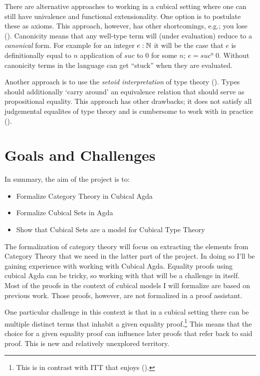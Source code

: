 \documentclass{article}
\begin{document}
There are alternative approaches to working in a cubical setting where one can
still have univalence and functional extensionality. One option is to postulate
these as axioms. This approach, however, has other shortcomings, e.g.; you lose
 (\cite{huber-2016}). Canonicity means that any well-type
term will (under evaluation) reduce to a \emph{canonical} form. For example for
an integer $e : \mathbb{N}$ it will be the case that $e$ is definitionally equal to $n$
application of $\mathit{suc}$ to $0$ for some $n$; $e = \mathit{suc}^n\ 0$.
Without canonicity terms in the language can get ``stuck'' when they are
evaluated.

Another approach is to use the \emph{setoid interpretation} of type theory
(\cite{hofmann-1995,huber-2016}). Types should additionally `carry around' an
equivalence relation that should serve as propositional equality. This approach
has other drawbacks; it does not satisfy all judgemental equalites of type
theory and is cumbersome to work with in practice (\cite[p. 4]{huber-2016}).
%
\section{Goals and Challenges}
%
In summary, the aim of the project is to:
%
\begin{itemize}
\item
Formalize Category Theory in Cubical Agda
\item
Formalize Cubical Sets in Agda
\item
Show that Cubical Sets are a model for Cubical Type Theory
\end{itemize}
%
The formalization of category theory will focus on extracting the elements from
Category Theory that we need in the latter part of the project. In doing so I'll
be gaining experience with working with Cubical Agda. Equality proofs using
cubical Agda can be tricky, so working with that will be a challenge in itself.
Most of the proofs in the context of cubical models I will formalize are based
on previous work. Those proofs, however, are not formalized in a proof
assistant.

One particular challenge in this context is that in a cubical setting there can
be multiple distinct terms that inhabit a given equality proof.\footnote{This is
in contrast with ITT that enjoys 
(\cite[p. 4]{huber-2016}).} This means that the choice for a given equality
proof can influence later proofs that refer back to said proof. This is new and
relatively unexplored territory.
\end{document}

